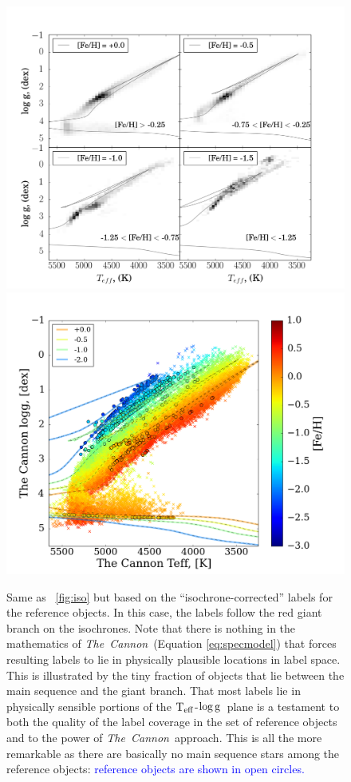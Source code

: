 \documentclass[12pt, preprint]{aastex}
\newcommand{\tc}{\textsl{The~Cannon}}
\newcommand{\teff}{\mbox{$\rm T_{eff}$}}
\newcommand{\logg}{\mbox{$\rm \log g$}}
\begin{document}
\begin{figure}[!h]
\centering
 \includegraphics[scale=0.26]{./plots/aftersubmit/fig9a2.png}
  \hspace{-20pt}
    \includegraphics[scale=0.26]{./plots/aftersubmit/fig9b2.png}
\caption{Same as \figurename~\ref{fig:iso} but based on the ``isochrone-corrected'' labels for the reference objects. In this case, the labels follow the red giant branch on the isochrones. Note that there is nothing in the mathematics of \tc\ (Equation \ref{eq:specmodel}) that forces resulting labels to lie in physically plausible locations in label space. This is illustrated by the tiny fraction of objects that lie between the main sequence and the giant branch. That most labels lie in physically sensible portions of the \teff-\logg\ plane is a testament to both the quality of the label coverage in the set of reference objects and to the power of \tc\ approach. This is all the more remarkable as there are basically no main sequence stars among the reference objects: \textcolor{blue}{ reference objects are shown in open circles.}}
\label{fig:iso2}
\end{figure}
\end{document}
